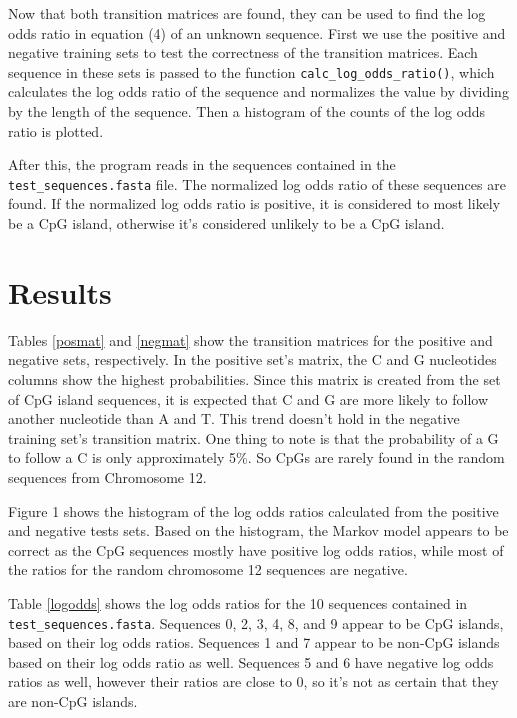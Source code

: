 \documentclass{acm_proc_article-sp}
\begin{document}
Now that both transition matrices are found, they can be used to find the log odds ratio in equation (4) of an unknown sequence.  First we use the positive and negative training sets to test the correctness of the transition matrices.  Each sequence in these sets is passed to the function \texttt{calc\_log\_odds\_ratio()}, which calculates the log odds ratio of the sequence and normalizes the value by dividing by the length of the sequence.  Then a histogram of the counts of the log odds ratio is plotted.

After this, the program reads in the sequences contained in the \texttt{test\_sequences.fasta} file.  The normalized log odds ratio of these sequences are found.  If the normalized log odds ratio is positive, it is considered to most likely be a CpG island, otherwise it's considered unlikely to be a CpG island.  

\section{Results}
Tables \ref{posmat} and \ref{negmat} show the transition matrices for the positive and negative sets, respectively.  In the positive set's matrix, the C and G nucleotides columns show the highest probabilities.  Since this matrix is created from the set of CpG island sequences, it is expected that C and G are more likely to follow another nucleotide than A and T.  This trend doesn't hold in the negative training set's transition matrix.  One thing to note is that the probability of a G to follow a C is only approximately 5\%.  So CpGs are rarely found in the random sequences from Chromosome 12.  

Figure 1 shows the histogram of the log odds ratios calculated from the positive and negative tests sets.  Based on the histogram, the Markov model appears to be correct as the CpG sequences mostly have positive log odds ratios, while most of the ratios for the random chromosome 12 sequences are negative.  


Table \ref{logodds} shows the log odds ratios for the 10 sequences contained in \texttt{test\_sequences.fasta}.  Sequences 0, 2, 3, 4, 8, and 9 appear to be CpG islands, based on their log odds ratios.  Sequences 1 and 7 appear to be non-CpG islands based on their log odds ratio as well.  Sequences 5 and 6 have negative log odds ratios as well, however their ratios are close to 0, so it's not as certain that they are non-CpG islands.  
\end{document}
